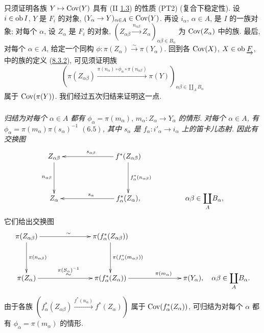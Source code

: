 \setcounter{subsubsection}{6}
\subsubsection{}
只须证明各族 $Y\mapsto\operatorname{Cov}(Y)$
具有 (II \hyperref[II.def1.3]{1.3}) 的性质 (PT2)
(复合下稳定性).
设 $i\in\operatorname{ob} I$, $Y$ 是 $F_i$ 的对象,
$(Y_\alpha\to Y)_{\alpha\in A}\in\Cov(Y)$.
再设 $i_\alpha$, $\alpha\in A$, 是 $I$ 的一族对象;
对每个 $\alpha$, 设 $Z_\alpha$ 是 $F_i$ 的对象,
$(Z_{\alpha\beta}\xrightarrow{n_{\alpha\beta}}Z_\alpha)_{\alpha\beta\in
B_\alpha}$ 为 $\operatorname{Cov}(Z_\alpha)$ 中的族.
最后, 对每个 $\alpha\in A$, 给定一个同构
$\phi:\pi(Z_\alpha)\xrightarrow{\sim}\pi(Y_\alpha)$.
回到各 $\operatorname{Cov}(X)$, $X\in\operatorname{ob}\underrightarrow{F}$,
中的族的定义 (\hyperref[VI.subsubsec8.3.2]{8.3.2}),
可见须证明族
$$
(\pi (Z_{\alpha \beta}) \xrightarrow{\pi(n_{\alpha}) \circ \phi_{\alpha} \circ
  \pi(n_{\alpha \beta})} \pi(Y))_{\alpha \beta \in \mathop{\coprod}_A
  B_{\alpha}}
$$
属于 $\operatorname{Cov}(\pi(Y))$.
我们经过五次归结来证明这一点.

\setcounter{subsubsection}{7}
\subsubsection{}
\emph{归结为对每个 $\alpha\in A$ 都有}
$\phi_\alpha=\pi(m_\alpha)$,
$m_\alpha:Z_\alpha\to Y_\alpha$ \emph{的情形}.
\emph{对每个 $\alpha\in A$, 有
$\phi_\alpha=\pi(m_\alpha)\pi(s_\alpha)^{-1}$
$(\hyperref[VI.prop6.5]{6.5})$,
其中 $s_\alpha$ 是 $f_\alpha:i'_\alpha\to i_\alpha$ 上的笛卡儿态射.
因此有交换图}
\[
\xymatrix@C=2.5cm@R=1.25cm{
Z_{\alpha\beta} \ar[d]_{n_{\alpha\beta}} & f^{\ast}(Z_{\alpha\beta})
\ar[l]_{s_{\alpha\beta}} \ar[d]^{f^{\ast}_{\alpha}(n_{\alpha\beta})}\\
Z_{\alpha} &   f^{\ast}_{\alpha}(Z_{\alpha}) \ar[l]_{s_{\alpha}},  &
**[l]\alpha\beta\in \displaystyle{\coprod_A} B_{\alpha},
}
\]
它们\pageoriginale{}给出交换图
\[
\xymatrix@C=2.5cm@R=1.25cm@H=.2cm{
\pi(Z_{\alpha\beta})  \ar[r]^{\sim} \ar[d]^{\pi(n_{\alpha\beta})}&
\pi(f^{\ast}_{\alpha}(Z_{\alpha\beta})) \ar[d]^{\pi(f^{\ast}_{\alpha}(m_{\alpha\beta}))}\\
\pi(Z_{\alpha})  \ar[r]^{\displaystyle\mathop{\sim}^{\pi(S_\alpha)^{-1}}} & \pi(f^{\ast}_{\alpha}(Z_{\alpha}))
\ar[r]^{\pi(m_{\alpha})} & \pi(Y_\alpha),\quad
\alpha\beta\in \displaystyle{\coprod_A} B_{\alpha}.}
\]
由于各族
$(f^{\ast}_{\alpha}(Z_{\alpha\beta})\xrightarrow{f^{\ast}(n_{\alpha})}
f^{\ast}(Z_{\alpha}))$
属于 $\operatorname{Cov}(f^{\ast}_{\alpha}(Z_{\alpha}))$,
可归结为对每个 $\alpha$ 都有 $\phi_\alpha=\pi(m_\alpha)$ 的情形.


